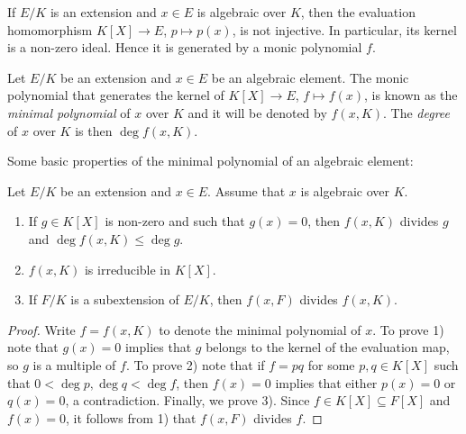 
If $E/K$ is an extension and $x\in E$ is algebraic
over $K$, then the evaluation homomorphism 
$K[X]\to E$, $p\mapsto p(x)$, is not injective. In particular,
its kernel is a non-zero ideal. Hence 
it is generated by a monic polynomial $f$. 

\begin{definition}
	Let $E/K$ be an extension and $x\in E$ be an algebraic element.  The monic
	polynomial that generates the kernel of $K[X]\to E$, $f\mapsto f(x)$, is
	known as the \emph{minimal polynomial} of $x$ over $K$ and it will be
	denoted by $f(x,K)$. The \emph{degree} of $x$ over $K$ is then $\deg
	f(x,K)$. 
\end{definition}

Some basic properties of the minimal polynomial of an algebraic element:

\begin{proposition}
	Let $E/K$ be an extension and $x\in E$. Assume that $x$ is algebraic over $K$. 
	\begin{enumerate}
		\item If $g\in K[X]$ is non-zero and such that $g(x)=0$, then $f(x,K)$ divides $g$ and  
		$\deg f(x,K)\leq\deg g$. 
		\item $f(x,K)$ is irreducible in $K[X]$.
		\item If $F/K$ is a subextension of $E/K$, then $f(x,F)$ divides
			$f(x,K)$. 
	\end{enumerate}
\end{proposition}

\begin{proof}
	Write $f=f(x,K)$ to denote the minimal polynomial of $x$. 
	To prove 1) note that $g(x)=0$ implies that	$g$ belongs to the kernel of
	the evaluation map, so $g$ is a multiple of $f$. To prove 2) 
	note that if $f=pq$ for some $p,q\in K[X]$ such that
	$0<\deg p,\deg q<\deg f$, then $f(x)=0$ implies that 
	either $p(x)=0$ or $q(x)=0$, a
	contradiction. Finally, we prove 3). Since $f\in K[X]\subseteq F[X]$ 
	and $f(x)=0$, it follows from 1) that $f(x,F)$ divides $f$. 
\end{proof}

